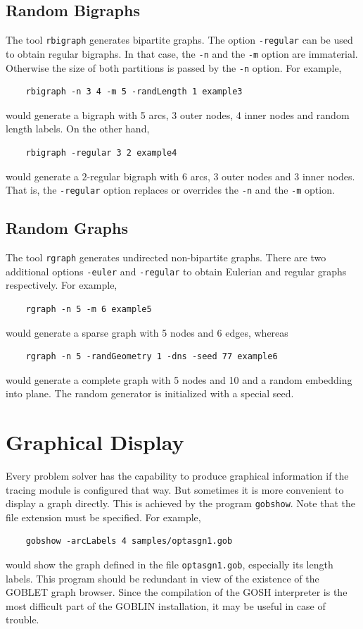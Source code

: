 \documentclass[a4paper,11pt,twoside]{book}
\begin{document}
\begin{multicols}{2}
\subsection{Random Bigraphs}
The tool \verb/rbigraph/ generates bipartite graphs. The option \verb/-regular/ can be used
to obtain regular bigraphs. In that case, the \verb/-n/ and the \verb/-m/
option are immaterial. Otherwise the size of both partitions is passed by the
\verb/-n/ option. For example,
\begin{verbatim}
    rbigraph -n 3 4 -m 5 -randLength 1 example3
\end{verbatim}
would generate a bigraph with 5 arcs, 3 outer nodes, 4 inner nodes and random
length labels. On the other hand,
\begin{verbatim}
    rbigraph -regular 3 2 example4
\end{verbatim}
would generate a $2$-regular bigraph with 6 arcs, 3 outer nodes and 3 inner
nodes. That is, the \verb/-regular/ option replaces or overrides the
\verb/-n/ and the \verb/-m/ option.


\subsection{Random Graphs}
The tool \verb/rgraph/ generates undirected non-bipartite graphs. There are two additional
options \verb/-euler/ and \verb/-regular/ to obtain Eulerian and regular graphs
respectively. For example,
\begin{verbatim}
    rgraph -n 5 -m 6 example5
\end{verbatim}
would generate a sparse graph with 5 nodes and 6 edges, whereas
\begin{verbatim}
    rgraph -n 5 -randGeometry 1 -dns -seed 77 example6
\end{verbatim}
would generate a complete graph with 5 nodes and 10 and a random embedding into
plane. The random generator is initialized with a special seed.


\section{Graphical Display}
Every problem solver has the capability to produce graphical information
if the tracing module is configured that way. But sometimes it is more
convenient to display a graph directly. This is achieved by the program
\verb/gobshow/. Note that the file extension must be specified. For example,
\begin{verbatim}
    gobshow -arcLabels 4 samples/optasgn1.gob
\end{verbatim}
would show the graph defined in the file \verb/optasgn1.gob/, especially its
length labels. This program should be redundant in view of the existence of the
GOBLET graph browser. Since the compilation of the GOSH interpreter is the most
difficult part of the GOBLIN installation, it may be useful in case of trouble.



\end{multicols}
\end{document}
